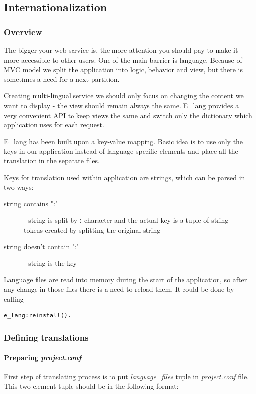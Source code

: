\subsection{Internationalization}
\subsubsection{Overview}The bigger your web service is, the more attention you
should pay to make it more accessible to other users. One of the main barrier is language. Because of MVC model we split the application into logic, behavior and view, but there is sometimes a need for a next partition.

Creating multi-lingual service we should only focus on changing the content we want to display - the view should remain always the same. E\_lang provides a very convenient API to keep views the same and switch only the dictionary which application uses for each request.

E\_lang has been built upon a key-value mapping. Basic idea is to use only the keys in our application instead of language-specific elements and place all the translation in the separate files.

Keys for translation used within application are strings, which can be parsed in two ways:
\begin{description}
\item[string contains ":"] - string is split by {\bf :} character and the actual key is a tuple of string - tokens created by splitting the original string
\item[string doesn't contain ":"] - string is the key
\end{description}

Language files are read into memory during the start of the application, so after any change in those files there is a need to reload them. It could be done by calling
\begin{verbatim}
e_lang:reinstall().
\end{verbatim}

\subsubsection{Defining translations}
\paragraph{Preparing {\em project.conf}}First step of translating process is to put {\it language\_files} tuple in {\it project.conf} file. This two-element tuple should be in the following format:

